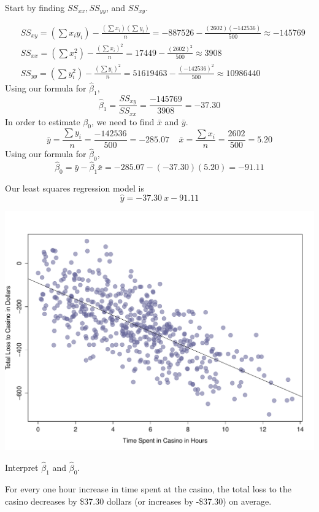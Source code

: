 \begin{example}
\begin{benumerate}
Start by finding $SS_{xx}, SS_{yy}$, and $SS_{xy}$.

\begin{align*}
&SS_{xy} = \left( \sum x_i y_i \right) - \frac{(\sum x_i) (\sum y_i)}{n} = -887526 - \frac{(2602)(-142536)}{500} \approx -145769 \\
&SS_{xx} = (\sum x_i^2) - \frac{(\sum x_i)^2}{n} = 17449 - \frac{(2602)^2}{500} \approx 3908 \\
&SS_{yy} = (\sum y_i^2) - \frac{(\sum y_i)^2}{n} = 51619463 - \frac{(-142536)^2}{500} \approx 10986440
\end{align*}
Using our formula for $\hat{\beta}_1$,
\[ \hat{\beta}_1 = \frac{SS_{xy}}{SS_{xx}} = \frac{-145769}{3908} = -37.30\]
In order to estimate $\beta_0$, we need to find $\bar{x}$ and $\bar{y}$.
\[ \bar{y} = \frac{\sum y_i}{n} = \frac{-142536}{500} = -285.07 \; \; \; \; \bar{x} = \frac{\sum x_i}{n} = \frac{2602}{500} = 5.20 \]
Using our formula for $\hat{\beta}_0$,
\[ \hat{\beta}_0 = \bar{y} - \hat{\beta}_1 \bar{x} = -285.07 - (-37.30)(5.20) = -91.11\]

Our least squares regression model is
\[ \hat{y} = -37.30~x - 91.11 \]

\begin{center}
\includegraphics[scale=0.5]{Section8/casinoexample.pdf}
\end{center}

\item Interpret $\hat{\beta}_1$ and $\hat{\beta}_0$.

For every one hour increase in time spent at the casino, the total loss to the casino decreases by \$37.30 dollars (or increases by -\$37.30) on average.


\end{benumerate}
\end{example}
